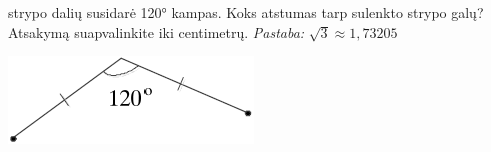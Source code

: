 \documentclass[a4paper]{article}
\newcounter{nameOfYourChoice}
\newcommand{\save}{\setcounter{nameOfYourChoice}{\value{enumi}}} %
\begin{document}
\begin{mdframed}[backgroundcolor=blue!10!white, linewidth=3pt]
\begin{enumerate}
\begin{minipage}[b]{0.77\linewidth}
strypo dalių susidarė 120° kampas. Koks atstumas tarp sulenkto
strypo galų? Atsakymą suapvalinkite iki centimetrų. \textit{Pastaba:} $\sqrt{3}\approx 1,73205$
\end{minipage}
\begin{minipage}[b]{0.23\linewidth}
\includegraphics[width=\textwidth]{vbe2014_22.png}
\end{minipage}
\save
\end{enumerate}
\end{mdframed}
\end{document}
